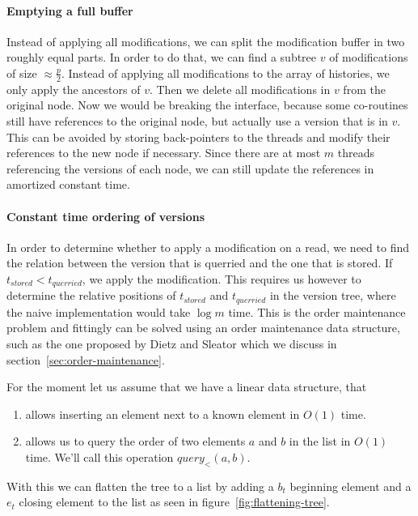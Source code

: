 \documentclass[11pt]{Thesis}
\theoremstyle{definition}
\newcommand{\Figref}[1]{figure~\ref{fig:#1}}
\newcommand{\Secref}[1]{section~\ref{sec:#1}}
\begin{document}
\paragraph{Emptying a full buffer} Instead of applying all modifications, we 
can split the modification buffer in two roughly equal parts. In order to do 
that, we can find a subtree $v$ of modifications of size $\approx \frac{p}{2}$. 
Instead of applying all modifications to the array of histories, we only 
apply the ancestors of $v$. Then we delete all modifications in $v$ from the 
original node. Now we would be breaking the interface, because some 
co-routines still have references to the original node, but actually use a 
version that is in $v$. This can be avoided by storing back-pointers to the 
threads and modify their references to the new node if necessary. Since there
are at most $m$ threads referencing the versions of each node, we can still
update the references in amortized constant time.

\paragraph{Constant time ordering of versions}
In order to determine whether to apply a modification on a read, we need to 
find the relation between the version that is querried and the one that is 
stored. If $t_{stored} < t_{querried}$, we apply the modification. This 
requires us however to determine the relative positions of $t_{stored}$ and 
$t_{querried}$ in the version tree, where the naive implementation would take 
$\log m$ time. This is the order maintenance problem and fittingly can be 
solved using an order maintenance data structure, such as the one proposed by 
Dietz and Sleator\cite{Diet87b} which we discuss in \Secref{order-maintenance}.

For the moment let us assume that we have a linear data structure, that
\begin{enumerate}
  \item allows inserting an element next to a known element in $O(1)$ time.
  \item allows us to query the order of two elements $a$ and $b$ in the list 
    in $O(1)$ time. We'll call this operation $query_<(a, b)$.
\end{enumerate}

With this we can flatten the tree to a list by adding a $b_t$ beginning 
element and a $e_t$ closing element to the list as seen in
\Figref{flattening-tree}.
\end{document}
